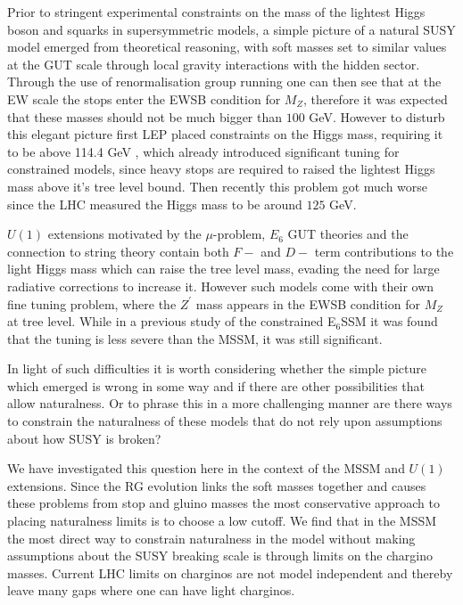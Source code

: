 \documentclass[preprint,amsmath,amssymb,aps,superscriptaddress,prd,showpacs,floatfix,nofootinbib]{revtex4-1}
\begin{document}
Prior to stringent experimental constraints on the mass of the
lightest Higgs boson and squarks in supersymmetric models, a simple
picture of a natural SUSY model emerged from theoretical reasoning,
with soft masses set to similar values at the GUT scale through local
gravity interactions with the hidden sector.  Through the use of
renormalisation group running one can then see that at the EW scale
the stops enter the EWSB condition for $M_Z$, therefore it was
expected that these masses should not be much bigger than $100$ GeV.
However to disturb this elegant picture first LEP placed constraints
on the Higgs mass, requiring it to be above 114.4 GeV
\cite{Barate:2003sz,Schael:2006cr}, which already introduced
significant tuning for constrained models, since heavy stops are
required to raised the lightest Higgs mass above it's tree level
bound. Then recently this problem got much worse since the LHC measured the
Higgs mass to be around $125$ GeV.

$U(1)$ extensions motivated by the $\mu$-problem, $E_6$ GUT theories
and the connection to string theory contain both $F-$ and $D-$ term
contributions to the light Higgs mass which can raise the tree level
mass, evading the need for large radiative corrections to increase it.
However such models come with their own fine tuning problem, where the
$Z^\prime$ mass appears in the EWSB condition for $M_Z$ at tree level.
While in a previous study of the constrained E$_6$SSM it was found
that the tuning is less severe than the MSSM, it was still significant.

In light of such difficulties it is worth considering whether the
simple picture which emerged is wrong in some way and if there are
other possibilities that allow naturalness.  Or to phrase this in a
more challenging manner are there ways to constrain the naturalness of
these models that do not rely upon assumptions about how SUSY is
broken?

We have investigated this question here in the context of the MSSM and
$U(1)$ extensions.  Since the RG evolution links the soft masses
together and causes these problems from stop and gluino masses the
most conservative approach to placing naturalness limits is to choose
a low cutoff. We find that in the MSSM the most direct way to
constrain naturalness in the model without making assumptions about
the SUSY breaking scale is through limits on the chargino
masses. Current LHC limits on charginos are not model independent and
thereby leave many gaps where one can have light charginos.
\end{document}
